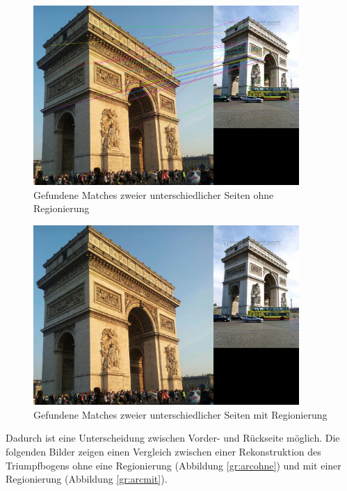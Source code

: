 \begin{figure}[h]
\centering
\includegraphics[width=0.9\textwidth]{gfx/Matchingpaare/matching_109_107.png}
\caption[Gefundene Matches zweier unterschiedlicher Seiten ohne Regionierung]{Gefundene Matches zweier unterschiedlicher Seiten ohne Regionierung}
\label{gr:matchohne}
\end{figure}
\FloatBarrier

\begin{figure}[h]
\centering
\includegraphics[width=0.9\textwidth]{gfx/Matchingpaare/region_109_107.png}
\caption[Gefundene Matches zweier unterschiedlicher Seiten mit Regionierung]{Gefundene Matches zweier unterschiedlicher Seiten mit Regionierung}
\label{gr:matchmit}
\end{figure}
\FloatBarrier

Dadurch ist eine Unterscheidung zwischen Vorder- und R\"uckseite m\"oglich. Die folgenden Bilder zeigen einen Vergleich zwischen einer Rekonstruktion des Triumpfbogens ohne eine Regionierung (Abbildung \ref{gr:arcohne}) und mit einer Regionierung (Abbildung \ref{gr:arcmit}).

